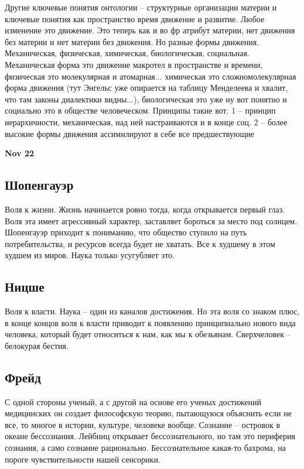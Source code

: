 \documentclass[a4paper, 12pt]{article}
\begin{document}
Другие ключевые понятия онтологии -- структурные организации материи 
и ключевые понятия как пространство время движение и развитие. Любое 
изменение это движение. Это теперь как и во фр атрибут материи, нет 
движения без материи и нет материи без движения. Но разные формы 
движения. Механическая, физическая, химическая, биологическая, 
социальная. Механическая форма это движение макротел в пространстве 
и времени, физическая это молекулярная и атомарная... химическая это 
сложномолекулярная форма движения (тут Энгельс уже опирается на таблицу 
Менделеева и хвалит, что там законы диалектики видны...), биологическая 
это уже ну вот понятно и социально это в обществе человеческом. Принципы 
такие вот. 1 -- принцип иерархичности, механическая, над ней 
настраиваются и в конце соц. 2 -- более высокие формы движения 
ассимилируют в себе все предшествующие 

\hfill \textbf{Nov 22}

\subsection{Шопенгауэр}

Воля к жизни. Жизнь начинается ровно тогда, когда открывается первый 
глаз. Воля эта имеет агрессивный характер, заставляет бороться за место 
под солнцем. Шопенгауэр приходит к пониманию, что общество ступило на 
путь потребительства, и ресурсов всегда будет не хватать. Все к худшему 
в этом худшем из миров. Наука только усугубляет это.

\subsection{Ницше}

Воля к власти. Наука -- один из каналов достижения. Но эта воля со 
знаком плюс, в конце концов воля к власти приводит к появлению 
принципиально нового вида человека, который будет относиться к нам, как 
мы к обезьянам. Сверхчеловек -- белокурая бестия.

\subsection{Фрейд}

С одной стороны ученый, а с другой на основе его ученых достижений 
медицинских он создает философскую теорию, пытающуюся объяснить если не 
все, то многое в истории, культуре, человеке вообще. Сознание -- 
островок в океане бессознания. Лейбниц открывает бессознательного, но 
там это периферия сознания, а само сознание рационально. Бессознательное 
какая-то бахрома, на пороге чувствительности нашей сенсорики.
\end{document}
